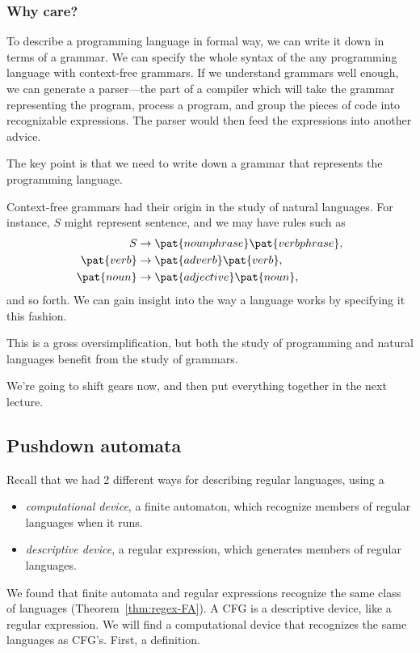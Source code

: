 \subsubsection{Why care?}
To describe a programming language in formal way, we can write it down in terms of a grammar. %
We can specify the whole syntax of the any programming language with context-free grammars. If we understand grammars well enough, we can generate a parser---the part of a compiler which will take the grammar representing the program, process a program, and group the pieces of code into recognizable expressions. The parser would then feed the expressions into another advice.

The key point is that we need to write down a grammar that represents the programming language.

Context-free grammars had their origin in the study of natural languages. For instance, $S$ might represent sentence, and we may have rules such as
\begin{align*}
S&\to\pat{noun phrase}\pat{verb phrase},\\
\pat{verb}&\to\pat{adverb}\pat{verb},\\
\pat{noun}&\to\pat{adjective}\pat{noun},
\end{align*}
and so forth. We can gain insight into the way a language works by specifying it this fashion.

This is a gross oversimplification, but both the study of programming and natural languages benefit from the study of grammars.

We're going to shift gears now, and then put everything together in the next lecture.

\subsection{Pushdown automata}

Recall that we had 2 different ways for describing regular languages, using a 
\begin{itemize}
\item
{\it computational device}, a finite automaton, which recognize members of regular languages when it runs.
\item
{\it descriptive device}, a regular expression, which generates members of regular languages.
\end{itemize}
We found that finite automata and regular expressions recognize the same class of languages (Theorem~\ref{thm:regex-FA}). A CFG is a descriptive device, like a regular expression. We will find a computational device that recognizes the same languages as CFG's. First, a definition.

